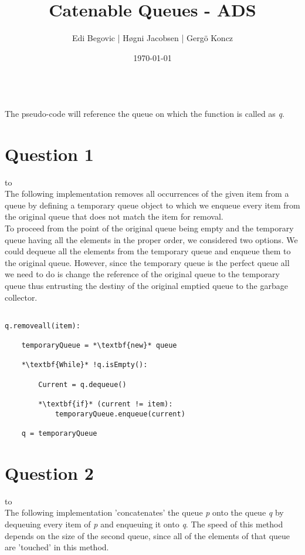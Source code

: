\documentclass[a4paper]{article}
\title{Catenable Queues - ADS}
\author{Edi Begovic | Høgni Jacobsen | Gergö Koncz}
\date{\today}
\def\headline#1{\hbox to \hsize{\hrulefill\quad\lower.3em\hbox{#1}\quad\hrulefill}}
\begin{document}
 
\maketitle

\ \\
\noindent
The pseudo-code will reference the queue on which the function is called as \textit{q}.
\ \\
\section*{Question 1}
\headline{-} \ \\

\noindent
The following implementation removes all occurrences of the given item from a queue by defining a temporary queue
object to which we enqueue every item from the original queue that does not match the item for removal. 
\ \\

\noindent
To proceed from the point of the original queue being empty and the temporary queue having all the elements in the proper order, we considered two options. We could dequeue all the elements from the temporary queue and enqueue them to the original queue. However, since the temporary queue is the perfect queue all we need to do is change the reference of the original queue to the temporary queue thus entrusting the destiny of the original emptied queue to the garbage collector. 

\noindent
\begin{lstlisting}[escapeinside={{*}{*}}]

q.removeall(item):

    temporaryQueue = *\textbf{new}* queue

    *\textbf{While}* !q.isEmpty():

        Current = q.dequeue()
        
        *\textbf{if}* (current != item):
            temporaryQueue.enqueue(current) 
    
    q = temporaryQueue

\end{lstlisting}

\newpage
\section*{Question 2}
\headline{-} \ \\
The following implementation 'concatenates' the queue \textit{p} onto the queue \textit{q} by
dequeuing every item of \textit{p} and enqueuing it onto \textit{q}. The speed of this method depends on the size of the second queue, since all of the elements of that queue are 'touched' in this method.
\ \\
\end{document}

